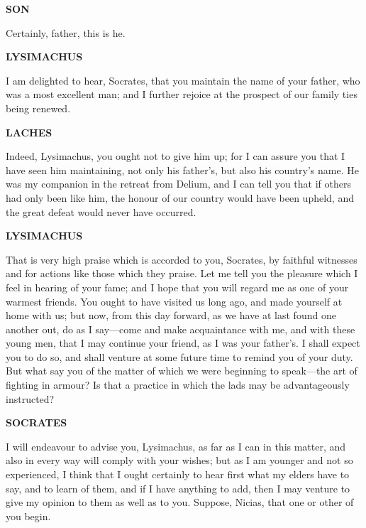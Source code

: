 \documentclass[11pt,letter]{book}
\begin{document}
\par \textbf{SON}
\par   Certainly, father, this is he.

\par \textbf{LYSIMACHUS}
\par   I am delighted to hear, Socrates, that you maintain the name of your father, who was a most excellent man; and I further rejoice at the prospect of our family ties being renewed.

\par \textbf{LACHES}
\par   Indeed, Lysimachus, you ought not to give him up; for I can assure you that I have seen him maintaining, not only his father's, but also his country's name. He was my companion in the retreat from Delium, and I can tell you that if others had only been like him, the honour of our country would have been upheld, and the great defeat would never have occurred.

\par \textbf{LYSIMACHUS}
\par   That is very high praise which is accorded to you, Socrates, by faithful witnesses and for actions like those which they praise. Let me tell you the pleasure which I feel in hearing of your fame; and I hope that you will regard me as one of your warmest friends. You ought to have visited us long ago, and made yourself at home with us; but now, from this day forward, as we have at last found one another out, do as I say—come and make acquaintance with me, and with these young men, that I may continue your friend, as I was your father's. I shall expect you to do so, and shall venture at some future time to remind you of your duty. But what say you of the matter of which we were beginning to speak—the art of fighting in armour? Is that a practice in which the lads may be advantageously instructed?

\par \textbf{SOCRATES}
\par   I will endeavour to advise you, Lysimachus, as far as I can in this matter, and also in every way will comply with your wishes; but as I am younger and not so experienced, I think that I ought certainly to hear first what my elders have to say, and to learn of them, and if I have anything to add, then I may venture to give my opinion to them as well as to you. Suppose, Nicias, that one or other of you begin.
\end{document}
